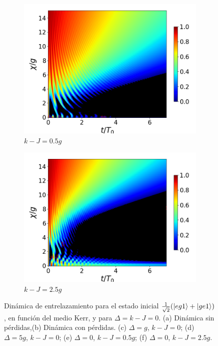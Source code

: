 \begin{figure}[h!]
    \vfill
    \begin{subfigure}{0.49\textwidth}
        \includegraphics[width=\textwidth]{figuras/ch4/concu/chi/eg1+ge1 d=0.0g k=0.5g J=0.0g gamma=0.25g concu chi dis.png}
        \caption{$k-J=0.5g$}
        \label{fig4:concu x 1 k1}
    \end{subfigure}
    \hfill
    \begin{subfigure}{0.49\textwidth}
        \includegraphics[width=\textwidth]{figuras/ch4/concu/chi/eg1+ge1 d=0.0g k=2.5g J=0.0g gamma=0.25g concu chi dis.png}
        \caption{$k-J=2.5g$}
        \label{fig4:concu x 1 k2}
    \end{subfigure}
    \caption{Dinámica de entrelazamiento para el estado inicial $\frac{1}{\sqrt{2}}(\ket{eg1}+\ket{ge1})$, en función del medio Kerr, y para $\Delta=k-J=0$. (a) Dinámica sin pérdidas,(b) Dinámica con pérdidas. (c) $\Delta=g$, $k-J=0$; (d) $\Delta=5g$, $k-J=0$; (e) $\Delta=0$, $k-J=0.5g$; (f) $\Delta=0$, $k-J=2.5g$.}
    \label{fig4:concu x 1}
\end{figure}
